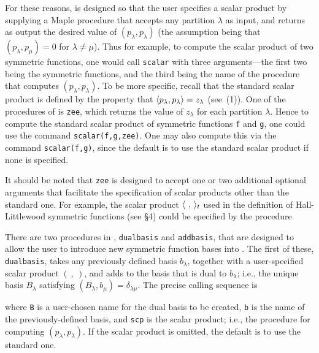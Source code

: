 For these reasons, \SF{} is designed so that the user specifies a scalar
product by supplying a Maple procedure that accepts any partition
$\lambda$ as input, and returns as output the desired value of
$(p_\lambda,p_\lambda)$ (the assumption being that $(p_\lambda,p_\mu)=0$
for $\lambda\ne\mu$). Thus for example, to compute the scalar product of
two symmetric functions, one would call {\tt scalar} with three
arguments---the first two being the symmetric functions, and the third
being the name of the procedure that computes $(p_\lambda,p_\lambda)$.
To be more specific, recall that the standard scalar product is defined
by the property that $\langle p_\lambda,p_\lambda\rangle=z_\lambda$ (see~(1)).
One of the procedures of \SF{} is {\tt zee}, which returns the value
of $z_\lambda$ for each partition $\lambda$. Hence to compute the
standard scalar product of symmetric functions {\tt f} and {\tt g},
one could use the command {\tt scalar(f,g,zee)}. One may also compute
this via the command {\tt scalar(f,g)}, since the default is to use
the standard scalar product if none is specified.

It should be noted that {\tt zee} is designed to accept one or two
additional optional arguments that facilitate the specification of scalar
products other than the standard one. For example, the scalar product
$\br{\ {,}\ }_t$ used in the definition of Hall-Littlewood symmetric
functions (see \S4) could be specified by the procedure


There are two procedures in \SF, {\tt dual\ul{}basis} and
{\tt add\ul{}basis}, that are designed to allow the user to introduce
new symmetric function bases into \SF. The first of these,
{\tt dual\ul{}basis}, takes any previously defined basis $b_\lambda$,
together with a user-specified scalar product $(\ {,}\ )$, and adds
to \SF{} the basis that is dual to $b_\lambda$; i.e., the unique basis
$B_\lambda$ satisfying $(B_\lambda,b_\mu)=\delta_{\lambda\mu}$.
The precise calling sequence is


\noindent where {\tt B} is a user-chosen name for the dual basis to be
created, {\tt b} is the name of the previously-defined basis,
and {\tt scp} is the scalar product; i.e., the procedure for computing
$(p_\lambda,p_\lambda)$. If the scalar product is omitted, the default
is to use the standard one.

